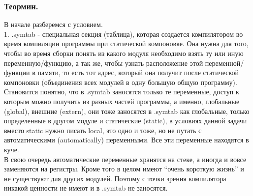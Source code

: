\documentclass[12pt, letterpaper]{article}
\begin{document}
\begin{center}
\end{center}
\newpage
\subsubsection{Теормин.}
В начале разберемся с условием.\\
1. .symtab - специальная секция (таблица), которая создается компилятором во время компиляции программы при статической компоновке. Она нужна для того, чтобы во время сборки понять из какого модуля необходимо взять ту или иную переменную/функцию, а так же, чтобы узнать расположение этой переменной/функции в памяти, то есть тот адрес, который она получит после статической компоновки (объединения всех модулей в одну большую общую программу).\\

Становится понятно, что в .symtab заносятся только те переменные, доступ к которым можно получить из разных частей программы, а именно, глобальные (global), внешние (extern), они тоже заносятся в .symtab как глобальные, только определенные в другом модуле и статические (static), в условиях данной задачи вместо static нужно писать local, это одно и тоже, но не путать с автоматическими (automatically) переменными. Все эти переменные находятся в куче.\\

В свою очередь автоматические переменные хранятся на стеке, а иногда и вовсе заменяются на регистры. Кроме того в целом имеют ``очень короткую жизнь'' и не существуют для других модулей. Поэтому с точки зрения компилятора никакой ценности не имеют и в .symtab не заносятся.\\
\end{document}
